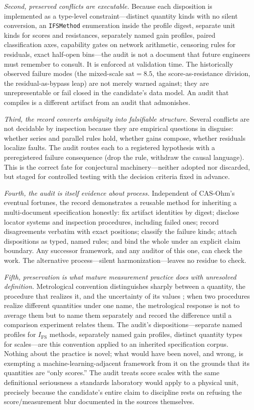 \emph{Second, preserved conflicts are executable.} Because each disposition
is implemented as a type-level constraint---distinct quantity kinds with no
silent conversion, an \texttt{IFSMethod} enumeration inside the profile
digest, separate unit kinds for scores and resistances, separately named gain
profiles, paired classification axes, capability gates on network arithmetic,
censoring rules for residuals, exact half-open bins---the audit is not a
document that future engineers must remember to consult. It is enforced at
validation time. The historically observed failure modes (the mixed-scale
$\mathrm{sat}=8.5$, the score-as-resistance division, the
residual-as-bypass leap) are not merely warned against; they are
unrepresentable or fail closed in the candidate's data model. An audit that
compiles is a different artifact from an audit that admonishes.

\emph{Third, the record converts ambiguity into falsifiable structure.}
Several conflicts are not decidable by inspection because they are empirical
questions in disguise: whether series and parallel rules hold, whether gains
compose, whether residuals localize faults. The audit routes each to a
registered hypothesis with a preregistered failure consequence (drop the
rule, withdraw the causal language). This is the correct fate for
conjectural machinery---neither adopted nor discarded, but staged for
controlled testing with the decision criteria fixed in advance.

\emph{Fourth, the audit is itself evidence about process.} Independent of
CAS-Ohm's eventual fortunes, the record demonstrates a reusable method for
inheriting a multi-document specification honestly: fix artifact identities
by digest; disclose locator systems and inspection procedures, including
failed ones; record disagreements verbatim with exact positions; classify the
failure kinds; attach dispositions as typed, named rules; and bind the whole
under an explicit claim boundary. Any successor framework, and any auditor of
this one, can check the work. The alternative process---silent
harmonization---leaves no residue to check.

\emph{Fifth, preservation is what mature measurement practice does with
unresolved definition.} Metrological convention distinguishes sharply
between a quantity, the procedure that realizes it, and the uncertainty of
its values \cite{vim,gum}; when two procedures realize different quantities
under one name, the metrological response is not to average them but to
name them separately and record the difference until a comparison experiment
relates them. The audit's dispositions---separate named profiles for
$I_{\mathrm{FS}}$ methods, separately named gain profiles, distinct quantity
types for scales---are this convention applied to an inherited specification
corpus. Nothing about the practice is novel; what would have been novel, and
wrong, is exempting a machine-learning-adjacent framework from it on the
grounds that its quantities are ``only scores.'' The audit treats score
scales with the same definitional seriousness a standards laboratory would
apply to a physical unit, precisely because the candidate's entire claim to
discipline rests on refusing the score/measurement blur documented in the
sources themselves.

